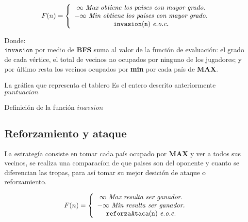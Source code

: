 \documentclass[12pt,twocolumn,draft]{article}
\begin{document}
$$ 
F(n)= \left\{\begin{array}{c l}
  \infty\ \textit{Max\ obtiene\ los\ paises\ con\ mayor\ grado.}\\
  -\infty\ \textit{Min\ obtiene\ los\ paises\ con\ mayor\ grado.}\\
  \mathtt{invasion(n)}\ \textit{e.o.c.}
\end{array}
\right.
$$

Donde:\\

$\mathtt{invasion}$ por medio de \textbf{BFS} suma al valor de la funci\'on de evaluaci\'on: el
grado de cada v\'ertice, el total de vecinos no ocupados por ninguno de los jugadores; y por \'ultimo
resta los vecinos ocupados por \textbf{min} por cada pa\'is de \textbf{MAX}.\\

\begin{algorithm}
\begin{algorithmic}[1]
\REQUIRE La gr\'afica que representa el tablero
\ENSURE Es el entero descrito anteriormente
\ENDFOR
{}
\ENDIF
{}
\ENDIF
{}
\ENDIF
\ENDFOR
\ENDWHILE
\RETURN $puntuacion$
\end{algorithmic}
\caption{Definici\'on de la funci\'on $inavsion$}
\label{invasion}
\end{algorithm}

\subsection{Reforzamiento y ataque}

La estrateg\'ia consiste en tomar cada pa\'is ocupado por \textbf{MAX} y ver a todos sus vecinos,
se realiza una comparac\'ion de que paises son del oponente y cuanto se diferencian las tropas, para así tomar su
mejor desici\'on de ataque o reforzamiento.

$$ 
F(n)= \left\{\begin{array}{c l}
  \infty\ \textit{Max\ resulta\ ser\ ganador.}\\
  -\infty\ \textit{Min\ resulta\ ser\ ganador.}\\
  \mathtt{reforzaAtaca(n)}\ \textit{e.o.c.}
\end{array}
\right.
$$
\end{document}

